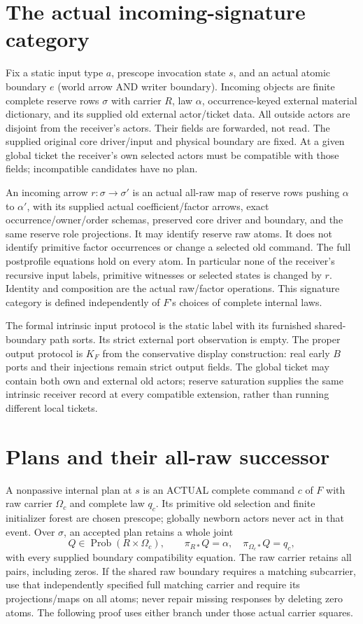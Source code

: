 \documentclass[11pt]{article}
\begin{document}
\section{The actual incoming-signature category}
Fix a static input type $a$, prescope invocation state $s$, and an actual atomic boundary $e$ (world arrow AND writer boundary). Incoming objects are finite complete reserve rows $\sigma$ with carrier $R$, law $\alpha$, occurrence-keyed external material dictionary, and its supplied old external actor/ticket data. All outside actors are disjoint from the receiver's actors. Their fields are forwarded, not read. The supplied original core driver/input and physical boundary are fixed. At a given global ticket the receiver's own selected actors must be compatible with those fields; incompatible candidates have no plan.

An incoming arrow $r:\sigma\to\sigma'$ is an actual all-raw map of reserve rows pushing $\alpha$ to $\alpha'$, with its supplied actual coefficient/factor arrows, exact occurrence/owner/order schemas, preserved core driver and boundary, and the same reserve role projections. It may identify reserve raw atoms. It does not identify primitive factor occurrences or change a selected old command. The full postprofile equations hold on every atom. In particular none of the receiver's recursive input labels, primitive witnesses or selected states is changed by $r$. Identity and composition are the actual raw/factor operations. This signature category is defined independently of $F$'s choices of complete internal laws.

The formal intrinsic input protocol is the static label with its furnished shared-boundary path sorts. Its strict external port observation is empty. The proper output protocol is $K_F$ from the conservative display construction: real early $B$ ports and their injections remain strict output fields. The global ticket may contain both own and external old actors; reserve saturation supplies the same intrinsic receiver record at every compatible extension, rather than running different local tickets.

\section{Plans and their all-raw successor}
A nonpassive internal plan at $s$ is an ACTUAL complete command $c$ of $F$ with raw carrier $\Omega_c$ and complete law $q_c$. Its primitive old selection and finite initializer forest are chosen prescope; globally newborn actors never act in that event. Over $\sigma$, an accepted plan retains a whole joint
\[
 Q\in\operatorname{Prob}(R\times\Omega_c),\qquad
 \pi_{R*}Q=\alpha,\quad \pi_{\Omega_c*}Q=q_c,              \tag{1}
\]
with every supplied boundary compatibility equation. The raw carrier retains all pairs, including zeros. If the shared raw boundary requires a matching subcarrier, use that independently specified full matching carrier and require its projections/maps on all atoms; never repair missing responses by deleting zero atoms. The following proof uses either branch under those actual carrier squares.
\end{document}
